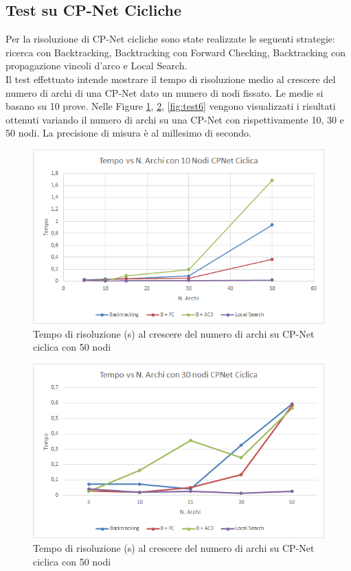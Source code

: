 \documentclass[a4paper,titlepage]{article}
\begin{document}
\subsection{Test su CP-Net Cicliche}
Per la risoluzione di CP-Net cicliche sono state realizzate le seguenti strategie: ricerca con Backtracking, Backtracking con Forward Checking, Backtracking con propagazione vincoli d'arco e Local Search.\\
Il test effettuato intende mostrare il tempo di risoluzione medio al crescere del numero di archi di una CP-Net dato un numero di nodi fissato. Le medie si basano su 10 prove. Nelle Figure \ref{fig:test4}, \ref{fig:test5}, \ref{fig:test6} vengono visualizzati i risultati ottenuti variando il numero di archi su una CP-Net con rispettivamente 10, 30 e 50 nodi. La precisione di misura è al millesimo di secondo.
\begin{figure}[!h]
\centering
\includegraphics[scale=0.75]{../img/10NodiCicliche.png}
\caption{Tempo di risoluzione (s) al crescere del numero di archi su CP-Net ciclica con 50 nodi}\label{fig:test4}
\end{figure}
\begin{figure}[!h]
\centering
\includegraphics[scale=0.75]{../img/30NodiCicliche.png}
\caption{Tempo di risoluzione (s) al crescere del numero di archi su CP-Net ciclica con 50 nodi}\label{fig:test5}
\end{figure}
\end{document}

